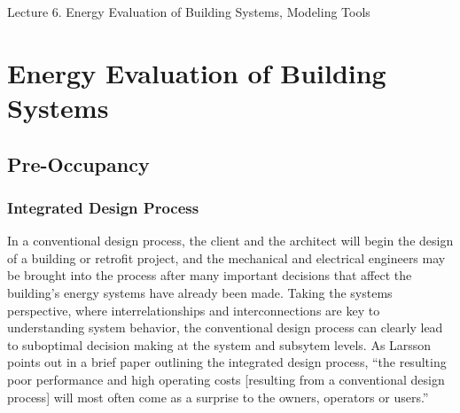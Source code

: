 \documentclass[10pt]{article}
\begin{document}
   \noindent
   \begin{center}

   \hrulefill
   
   \vspace{5pt}
   
   \vspace{0pt}
   
   {\Large \hfill  Lecture 6. Energy Evaluation of Building Systems, Modeling Tools}
   \vspace{5pt}
   
  
   \hrulefill
   \end{center}

{}

\section{Energy Evaluation of Building Systems}

\subsection{Pre-Occupancy}

\subsubsection{Integrated Design Process}

In a conventional design process, the client and the architect will begin the design of a building or retrofit project, and the mechanical and electrical engineers may be brought into the process after many important decisions that affect the building's energy systems have already been made. Taking the systems perspective, where interrelationships and interconnections are key to understanding system behavior, the conventional design process can clearly lead to suboptimal decision making at the system and subsytem levels. As Larsson points out in a brief paper outlining the integrated design process, ``the resulting poor performance and high operating costs [resulting from a conventional design process] will most often come as a surprise to the owners, operators or users.'' \cite{larsson}
\end{document}
